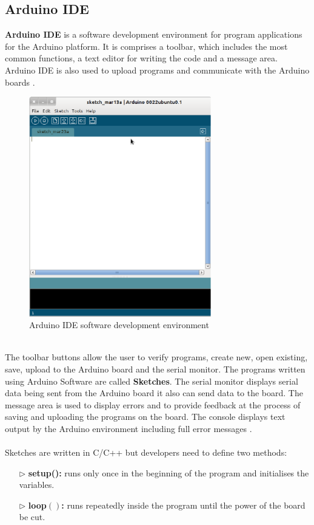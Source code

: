\documentclass[12pt,a4paper,draft]{report}
\begin{document}
\subsection{Arduino IDE}
\textbf{Arduino IDE} is a software development environment for program applications for the Arduino platform. It is comprises a toolbar, which includes the most common functions, a text editor for writing the code and a message area. Arduino IDE is also used to upload programs and communicate with the Arduino boards \cite{website:arduinosoftware}.
\begin{figure}[H]
    \centering
    \includegraphics*[width=300px]{arduinomain}
    \caption{Arduino IDE software development environment}
\end{figure}
\ \\
The toolbar buttons allow the user to verify programs, create new, open existing, save, upload to the Arduino board and the serial monitor. The programs written using Arduino Software are called \textbf{Sketches}. The serial monitor displays serial data being sent from the Arduino board it also can send data to the board. The message area is used to display errors and to provide feedback at the process of saving and uploading the programs on the board. The console displays text output by the Arduino environment including full error messages \cite{website:arduinosoftware}.\\
\ \\
Sketches are written in C/C++ but developers need to define two methods:
\begin{itemize}
    \item[$\triangleright$] \textbf{setup():} runs only once in the beginning of the program and initialises the variables.
    \item[$\triangleright$] \textbf{loop$()$:} runs repeatedly inside the program until the power of the board be cut.   
\end{itemize}
\end{document}
